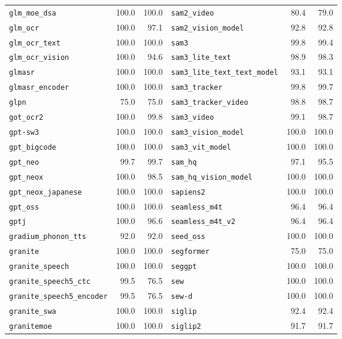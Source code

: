 \begin{longtable}{@{}lrr@{\hspace{24pt}}lrr@{}}
\texttt{glm\_moe\_dsa} & 100.0 & 100.0 & \texttt{sam2\_video} & 80.4 & 79.0 \\
\texttt{glm\_ocr} & 100.0 & 97.1 & \texttt{sam2\_vision\_model} & 92.8 & 92.8 \\
\texttt{glm\_ocr\_text} & 100.0 & 100.0 & \texttt{sam3} & 99.8 & 99.4 \\
\texttt{glm\_ocr\_vision} & 100.0 & 94.6 & \texttt{sam3\_lite\_text} & 98.9 & 98.3 \\
\texttt{glmasr} & 100.0 & 100.0 & \texttt{sam3\_lite\_text\_text\_model} & 93.1 & 93.1 \\
\texttt{glmasr\_encoder} & 100.0 & 100.0 & \texttt{sam3\_tracker} & 99.8 & 99.7 \\
\texttt{glpn} & 75.0 & 75.0 & \texttt{sam3\_tracker\_video} & 98.8 & 98.7 \\
\texttt{got\_ocr2} & 100.0 & 99.8 & \texttt{sam3\_video} & 99.1 & 98.7 \\
\texttt{gpt-sw3} & 100.0 & 100.0 & \texttt{sam3\_vision\_model} & 100.0 & 100.0 \\
\texttt{gpt\_bigcode} & 100.0 & 100.0 & \texttt{sam3\_vit\_model} & 100.0 & 100.0 \\
\texttt{gpt\_neo} & 99.7 & 99.7 & \texttt{sam\_hq} & 97.1 & 95.5 \\
\texttt{gpt\_neox} & 100.0 & 98.5 & \texttt{sam\_hq\_vision\_model} & 100.0 & 100.0 \\
\texttt{gpt\_neox\_japanese} & 100.0 & 100.0 & \texttt{sapiens2} & 100.0 & 100.0 \\
\texttt{gpt\_oss} & 100.0 & 100.0 & \texttt{seamless\_m4t} & 96.4 & 96.4 \\
\texttt{gptj} & 100.0 & 96.6 & \texttt{seamless\_m4t\_v2} & 96.4 & 96.4 \\
\texttt{gradium\_phonon\_tts} & 92.0 & 92.0 & \texttt{seed\_oss} & 100.0 & 100.0 \\
\texttt{granite} & 100.0 & 100.0 & \texttt{segformer} & 75.0 & 75.0 \\
\texttt{granite\_speech} & 100.0 & 100.0 & \texttt{seggpt} & 100.0 & 100.0 \\
\texttt{granite\_speech5\_ctc} & 99.5 & 76.5 & \texttt{sew} & 100.0 & 100.0 \\
\texttt{granite\_speech5\_encoder} & 99.5 & 76.5 & \texttt{sew-d} & 100.0 & 100.0 \\
\texttt{granite\_swa} & 100.0 & 100.0 & \texttt{siglip} & 92.4 & 92.4 \\
\texttt{granitemoe} & 100.0 & 100.0 & \texttt{siglip2} & 91.7 & 91.7 \\

\end{longtable}
